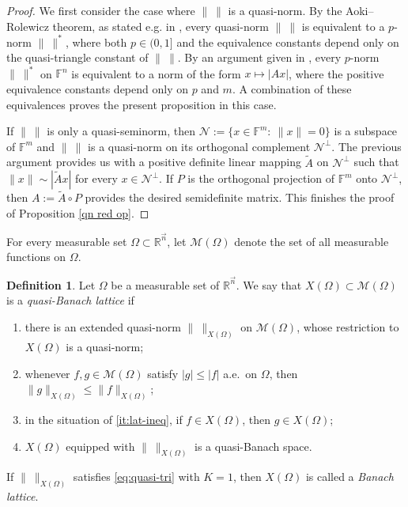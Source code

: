 \documentclass[11pt, reqno]{amsart}
\theoremstyle{definition}
\newtheorem{definition}[theorem]{Definition}
\theoremstyle{remark}
\numberwithin{equation}{section}
\newcommand{\F}{\mathbb F}
\newcommand{\Norm}[2]{\|#1\|_{#2}}
\begin{document}
\begin{proof}
We first consider the case where $\|\ \|$ is a quasi-norm.
By the Aoki--Rolewicz theorem, as stated e.g. in \cite[Theorem 1.2]{Malig04},
every quasi-norm $\|\ \|$ is equivalent to a $p$-norm $\|\ \|^*$,
where both $p\in(0,1]$ and the equivalence constants depend only on
the quasi-triangle constant of $\|\ \|$.
By an argument given in \cite[page 1237]{FR04},
every $p$-norm $\|\ \|^*$ on $\F^n$ is equivalent to
a norm of the form $x\mapsto |Ax|$,
where the positive equivalence constants depend only on $p$ and $m$.
A combination of these equivalences proves the present proposition in this case.

If $\|\ \|$ is only a quasi-seminorm,
then $\mathcal N:=\{x\in\F^m:\ \|x\|=0\}$ is a subspace of $\F^m$
and $\|\ \|$ is a quasi-norm on its orthogonal complement $\mathcal N^{\perp}$.
The previous argument provides us with a positive definite
linear mapping $\widetilde A$ on $\mathcal N^{\perp}$ such that
$\|x\|\sim|\widetilde Ax|$ for every $x\in \mathcal N^{\perp}$.
If $P$ is the orthogonal projection of $\F^m$ onto $\mathcal N^{\perp}$,
then $A:=\widetilde A\circ P$ provides the desired semidefinite matrix.
This finishes the proof of Proposition \ref{qn red op}.
\end{proof}

For every measurable set $\Omega\subset\mathbb R^{\vec n}$,
let $\mathscr{M}(\Omega)$ denote the set of all
measurable functions on $\Omega$.

\begin{definition}\label{Debqfs}
Let $\Omega$ be a measurable set of $\mathbb R^{\vec n}$.
We say that $X(\Omega)\subset\mathscr{M}(\Omega)$ is a \emph{quasi-Banach lattice} if
\begin{enumerate}[\rm(i)]
  \item there is an extended quasi-norm $\Norm{\ }{X(\Omega)}$ on $\mathscr{M}(\Omega)$, whose restriction to $X(\Omega)$ is a quasi-norm;
  \item\label{it:lat-ineq} whenever $f,g\in \mathscr M(\Omega)$ satisfy $|g|\le |f|$ a.e.\ on $\Omega$, then $\|g\|_{X(\Omega)}\le\|f\|_{X(\Omega)}$;
  \item\label{it:lat-incl} in the situation of \eqref{it:lat-ineq}, if $f\in X(\Omega)$, then $g\in X(\Omega)$;
  \item $X(\Omega)$ equipped with $\Norm{\ }{X(\Omega)}$ is a quasi-Banach space.
\end{enumerate}
If $\|\ \|_{X(\Omega)}$ satisfies \eqref{eq:quasi-tri} with $K=1$, then $X(\Omega)$ is called a
\emph{Banach lattice}.
\end{definition}
\end{document}
